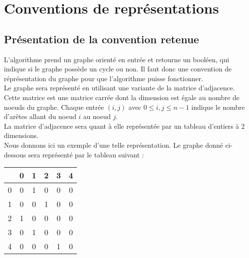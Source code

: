 \section{Conventions de représentations}

\subsection*{Présentation de la convention retenue}
L'algorithme prend un graphe orienté en entrée et retourne un booléen, qui indique si le graphe possède un cycle ou non. Il faut donc une convention de réprésentation du graphe pour que l'algorithme puisse fonctionner. \\

Le graphe sera représenté en utilisant une variante de la matrice d'adjacence. Cette matrice est une matrice carrée dont la dimension est égale au nombre de noeuds du graphe. Chaque entrée $(i,j)$ avec $0\leq i,j \leq n-1$ indique le nombre d'arêtes allant du noeud $i$ au noeud $j$.\\

La matrice d'adjacence sera quant à elle représentée par un tableau d'entiers à 2 dimensions. \\

Nous donnons ici un exemple d'une telle représentation. Le graphe donné ci-dessous sera représenté par le tableau suivant :
\begin{center}

\begin{tabular}{c|ccccc}
&0 & 1 & 2 & 3 & 4\\
\hline
0&0&1&0&0&0\\
1&0&0&1&0&0\\
2&1&0&0&0&0\\
3&0&1&0&0&0\\
4&0&0&0&1&0\\
\end{tabular}
\end{center}

